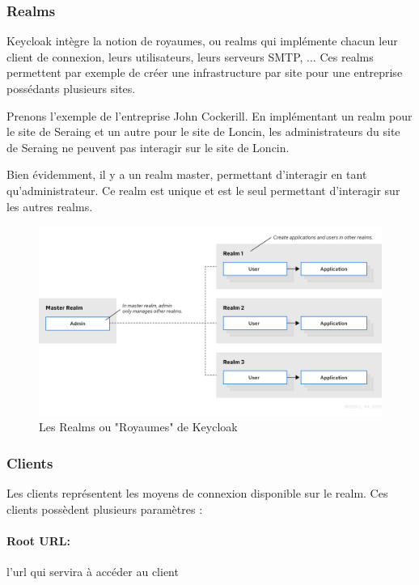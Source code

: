 \subsubsection{Realms}

Keycloak intègre la notion de royaumes, ou realms qui implémente chacun leur client de connexion,
leurs utilisateurs, leurs serveurs SMTP, ... Ces realms permettent par exemple de créer une
infrastructure par site pour une entreprise possédants plusieurs sites.

Prenons l'exemple de l'entreprise John Cockerill. En implémentant un realm pour le site de Seraing et
un autre pour le site de Loncin, les administrateurs du site de Seraing ne peuvent pas interagir sur le
site de Loncin.

Bien évidemment, il y a un realm master, permettant d'interagir en tant qu'administrateur. Ce realm
est unique et est le seul permettant d'interagir sur les autres realms.

\begin{figure}[H]
    \centering
    \includegraphics[width=\textwidth]{./img/Keycloak-realm.png}
    \caption{Les Realms ou "Royaumes" de Keycloak}
    \label{fig:keycloak_realms}
\end{figure}

\subsubsection{Clients}

Les clients représentent les moyens de connexion disponible sur le realm. Ces clients possèdent
plusieurs paramètres :

\paragraph{Root URL:} l'url qui servira à accéder au client

